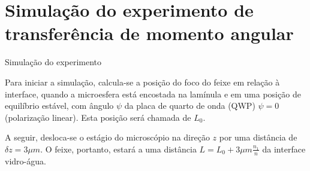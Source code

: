 \documentclass[10pt]{beamer}
\begin{document}
\section{Simulação do experimento de transferência de momento angular}

\begin{frame}[fragile]{Simulação do experimento}

    \begin{center}

        Para iniciar a simulação, calcula-se a posição do foco do feixe em relação à interface, quando a microesfera está encostada na lamínula e em uma posição de equilíbrio estável, com ângulo $\psi$ da placa de quarto de onda (QWP) $\psi=0$ (polarização linear). Esta posição será chamada de $L_0$.

        A seguir, desloca-se o estágio do microscópio na direção $z$ por uma distância de $\delta z = 3 \mu m$. O feixe, portanto, estará a uma distância $L=L_0 + 3 \mu m \frac{n_1}{n}$ da interface vidro-água.

    \end{center}

\end{frame}
\end{document}
